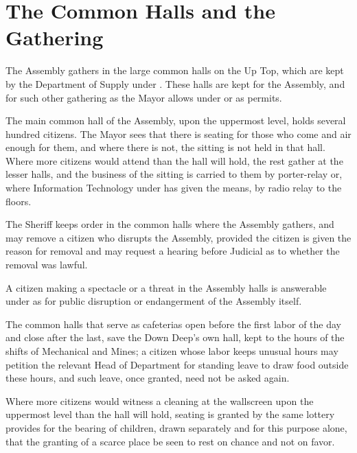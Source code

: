 \section{The Common Halls and the Gathering}
\label{sec:assembly:common-halls-and-the-gathering}

The Assembly gathers in the large common halls on the Up Top, which are kept by the Department of Supply under . These halls are kept for the Assembly, and for such other gathering as the Mayor allows under  or as  permits.

\begin{clauses}
\item The main common hall of the Assembly, upon the uppermost level, holds several hundred citizens. The Mayor sees that there is seating for those who come and air enough for them, and where there is not, the sitting is not held in that hall. Where more citizens would attend than the hall will hold, the rest gather at the lesser halls, and the business of the sitting is carried to them by porter-relay or, where Information Technology under  has given the means, by radio relay to the floors.
\item The Sheriff keeps order in the common halls where the Assembly gathers, and may remove a citizen who disrupts the Assembly, provided the citizen is given the reason for removal and may request a hearing before Judicial as to whether the removal was lawful.
\item A citizen making a spectacle or a threat in the Assembly halls is answerable under  as for public disruption or endangerment of the Assembly itself.
\item The common halls that serve as cafeterias open before the first labor of the day and close after the last, save the Down Deep's own hall, kept to the hours of the shifts of Mechanical and Mines; a citizen whose labor keeps unusual hours may petition the relevant Head of Department for standing leave to draw food outside these hours, and such leave, once granted, need not be asked again.
\item Where more citizens would witness a cleaning at the wallscreen upon the uppermost level than the hall will hold, seating is granted by the same lottery  provides for the bearing of children, drawn separately and for this purpose alone, that the granting of a scarce place be seen to rest on chance and not on favor.
\end{clauses}

